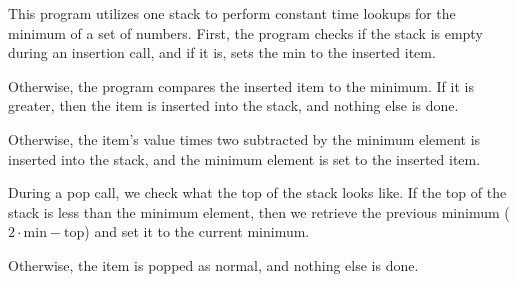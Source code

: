 \documentclass[letterpaper,12pt]{article}
\begin{document}
This program utilizes one stack to perform constant time lookups for the minimum of a set of numbers.
First, the program checks if the stack is empty during an insertion call, and
if it is, sets the min to the inserted item.


Otherwise, the program compares the inserted item to the minimum. If it is greater, then the item
is inserted into the stack, and nothing else is done.


Otherwise, the item's value times two subtracted by the minimum element is inserted into the stack,
and the minimum element is set to the inserted item.


During a pop call, we check what the top of the stack looks like. If the top of the stack is less than the
minimum element, then we retrieve the previous minimum ($2 \cdot \mathrm{min} - \mathrm{top}$) and set
it to the current minimum. 


Otherwise, the item is popped as normal, and nothing else is done.
\end{document}
